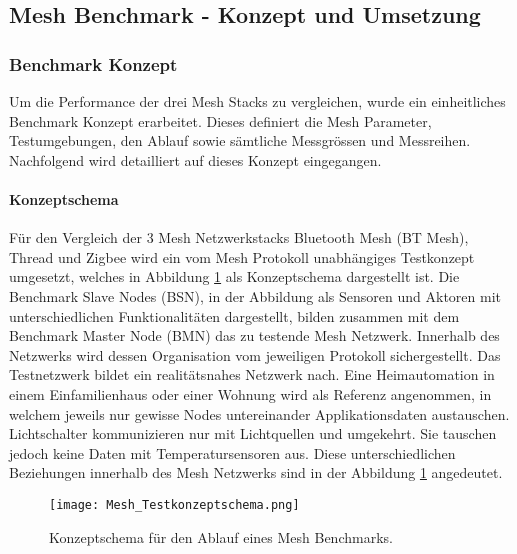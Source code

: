 \vspace*{4cm}
\begin{center}
\part{Mesh Benchmark - Konzept und Umsetzung}\label{part:MeshBenchmarkKonzeptundUmsetzung}
\end{center}
\vspace*{\fill}
\clearpage

\section{Benchmark Konzept}\label{sec:BenchmarkKonzeptMeshNetzwerke}
Um die Performance der drei Mesh Stacks zu vergleichen, wurde ein einheitliches Benchmark Konzept erarbeitet. Dieses definiert die Mesh Parameter, Testumgebungen, den Ablauf sowie sämtliche Messgrössen und Messreihen. Nachfolgend wird detailliert auf dieses Konzept eingegangen.

\subsection{Konzeptschema}\label{subsec:KonzeptschemaMesh}
Für den Vergleich der 3 Mesh Netzwerkstacks Bluetooth Mesh (BT Mesh), Thread und Zigbee wird ein vom Mesh Protokoll unabhängiges Testkonzept umgesetzt, welches in Abbildung \ref{fig:MeshTestKonzept} als Konzeptschema dargestellt ist.
Die Benchmark Slave Nodes (BSN), in der Abbildung als Sensoren und Aktoren mit unterschiedlichen Funktionalitäten dargestellt, bilden zusammen mit dem Benchmark Master Node (BMN) das zu testende Mesh Netzwerk.
Innerhalb des Netzwerks wird dessen Organisation vom jeweiligen Protokoll sichergestellt.
Das Testnetzwerk bildet ein realitätsnahes Netzwerk nach.
Eine Heimautomation in einem Einfamilienhaus oder einer Wohnung wird als Referenz angenommen, in welchem jeweils nur gewisse Nodes untereinander Applikationsdaten austauschen.
Lichtschalter kommunizieren nur mit Lichtquellen und umgekehrt. Sie tauschen jedoch keine Daten mit Temperatursensoren aus.
Diese unterschiedlichen Beziehungen innerhalb des Mesh Netzwerks sind in der Abbildung \ref{fig:MeshTestKonzept} angedeutet.

\begin{figure}[h]
	\centering
	\texttt{[image: Mesh\_Testkonzeptschema.png]}
	\caption{Konzeptschema für den Ablauf eines Mesh Benchmarks.}\label{fig:MeshTestKonzept}
\end{figure}

